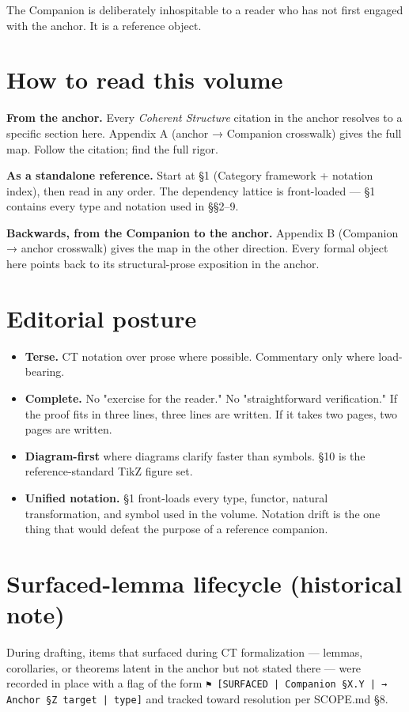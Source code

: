 \documentclass[11pt, openany]{book}
\begin{document}
The Companion is deliberately inhospitable to a reader who has not first engaged with the anchor. It is a reference object.

\section{How to read this volume}

\textbf{From the anchor.} Every \textit{Coherent Structure} citation in the anchor resolves to a specific section here. Appendix A (anchor → Companion crosswalk) gives the full map. Follow the citation; find the full rigor.

\textbf{As a standalone reference.} Start at §1 (Category framework + notation index), then read in any order. The dependency lattice is front-loaded --- §1 contains every type and notation used in §§2–9.

\textbf{Backwards, from the Companion to the anchor.} Appendix B (Companion → anchor crosswalk) gives the map in the other direction. Every formal object here points back to its structural-prose exposition in the anchor.

\section{Editorial posture}

\begin{itemize}
\item \textbf{Terse.} CT notation over prose where possible. Commentary only where load-bearing.
\item \textbf{Complete.} No "exercise for the reader." No "straightforward verification." If the proof fits in three lines, three lines are written. If it takes two pages, two pages are written.
\item \textbf{Diagram-first} where diagrams clarify faster than symbols. §10 is the reference-standard TikZ figure set.
\item \textbf{Unified notation.} §1 front-loads every type, functor, natural transformation, and symbol used in the volume. Notation drift is the one thing that would defeat the purpose of a reference companion.
\end{itemize}

\section{Surfaced-lemma lifecycle (historical note)}

During drafting, items that surfaced during CT formalization --- lemmas, corollaries, or theorems latent in the anchor but not stated there --- were recorded in place with a flag of the form \texttt{⚑ [SURFACED | Companion §X.Y | → Anchor §Z target | type]} and tracked toward resolution per SCOPE.md §8.
\end{document}
